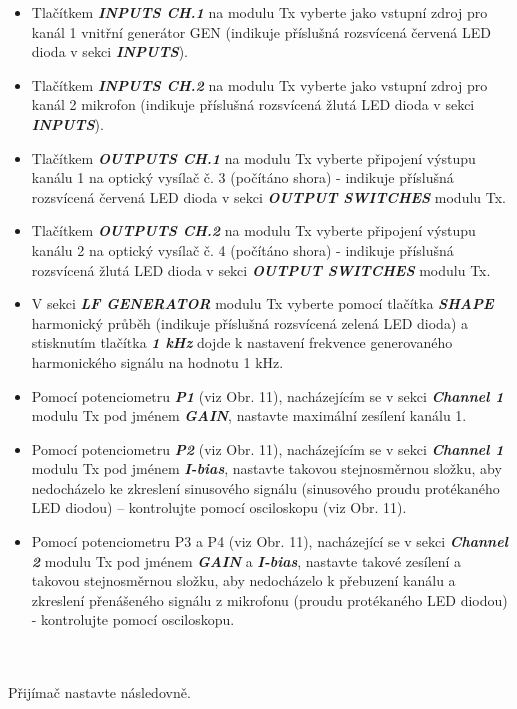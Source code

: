 \begin{itemize}
\item Tlačítkem \textbf{\textit{INPUTS CH.1}} na modulu Tx vyberte jako vstupní zdroj pro kanál 1 vnitřní generátor GEN (indikuje příslušná rozsvícená červená LED dioda v sekci \textbf{\textit{INPUTS}}).
\item Tlačítkem \textbf{\textit{INPUTS CH.2}} na modulu Tx vyberte jako vstupní zdroj pro kanál 2 mikrofon (indikuje příslušná rozsvícená žlutá LED dioda v sekci \textbf{\textit{INPUTS}}).
\item Tlačítkem \textbf{\textit{OUTPUTS CH.1}} na modulu Tx vyberte připojení výstupu kanálu 1 na optický vysílač č. 3 (počítáno shora) - indikuje příslušná rozsvícená červená LED dioda v sekci \textbf{\textit{OUTPUT SWITCHES}} modulu Tx.
\item Tlačítkem \textbf{\textit{OUTPUTS CH.2}} na modulu Tx vyberte připojení výstupu kanálu 2 na optický vysílač č. 4 (počítáno shora) - indikuje příslušná rozsvícená žlutá LED dioda v sekci \textbf{\textit{OUTPUT SWITCHES}} modulu Tx.
\item V sekci \textbf{\textit{LF GENERATOR}} modulu Tx vyberte pomocí tlačítka \textbf{\textit{SHAPE}} harmonický průběh (indikuje příslušná rozsvícená zelená LED dioda) a stisknutím tlačítka \textbf{\textit{1 kHz}} dojde k nastavení frekvence generovaného harmonického signálu na hodnotu 1 kHz.
\item Pomocí potenciometru \textbf{\textit{P1}} (viz Obr. 11), nacházejícím se v sekci \textbf{\textit{Channel 1}} modulu Tx pod jménem \textbf{\textit{GAIN}}, nastavte maximální zesílení kanálu 1.
\item Pomocí potenciometru \textbf{\textit{P2}} (viz Obr. 11), nacházejícím se v sekci \textbf{\textit{Channel 1}} modulu Tx pod jménem \textbf{\textit{I-bias}}, nastavte takovou stejnosměrnou složku, aby nedocházelo ke zkreslení sinusového signálu (sinusového proudu protékaného LED diodou) – kontrolujte pomocí osciloskopu (viz Obr. 11).
\item Pomocí potenciometru P3 a P4 (viz Obr. 11), nacházející se v sekci \textbf{\textit{Channel 2}} modulu Tx pod jménem \textbf{\textit{GAIN}} a \textbf{\textit{I-bias}}, nastavte takové zesílení a takovou stejnosměrnou složku, aby nedocházelo k přebuzení kanálu a zkreslení přenášeného signálu z mikrofonu (proudu protékaného LED diodou) - kontrolujte pomocí osciloskopu.
\end{itemize}
\\\\
Přijímač nastavte následovně.
